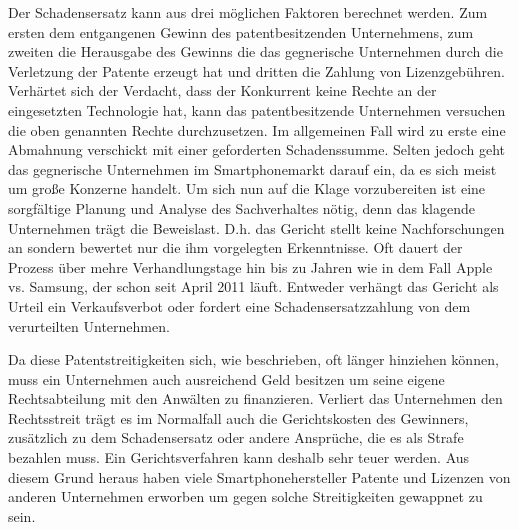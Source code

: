 Der Schadensersatz kann aus drei möglichen Faktoren berechnet werden. Zum ersten dem entgangenen Gewinn des patentbesitzenden Unternehmens, zum zweiten die Herausgabe des Gewinns die das gegnerische Unternehmen durch die Verletzung der Patente erzeugt hat und dritten die Zahlung von Lizenzgebühren. Verhärtet sich der Verdacht, dass der Konkurrent keine Rechte an der eingesetzten Technologie hat, kann das patentbesitzende Unternehmen versuchen die oben genannten Rechte durchzusetzen. Im allgemeinen Fall wird zu erste eine Abmahnung verschickt mit einer geforderten  Schadenssumme. Selten jedoch geht das gegnerische Unternehmen im Smartphonemarkt darauf ein, da es sich meist um große Konzerne handelt. Um sich nun auf die Klage vorzubereiten ist eine sorgfältige Planung und Analyse des Sachverhaltes nötig, denn das klagende Unternehmen trägt die Beweislast. D.h. das Gericht stellt keine Nachforschungen an sondern bewertet nur die ihm vorgelegten Erkenntnisse. Oft dauert der Prozess über mehre Verhandlungstage hin bis zu Jahren wie in dem Fall  Apple vs. Samsung,  der schon seit April 2011 läuft. Entweder verhängt das Gericht als Urteil ein Verkaufsverbot oder fordert eine Schadensersatzzahlung von dem verurteilten Unternehmen.

Da diese Patentstreitigkeiten sich, wie beschrieben, oft länger hinziehen können, muss ein Unternehmen auch ausreichend Geld besitzen um seine eigene Rechtsabteilung mit den Anwälten zu finanzieren. Verliert das Unternehmen den Rechtsstreit trägt es im Normalfall auch die Gerichtskosten des Gewinners, zusätzlich zu dem Schadensersatz oder andere Ansprüche, die es als Strafe bezahlen muss. Ein Gerichtsverfahren kann deshalb sehr teuer werden. Aus diesem Grund heraus haben viele Smartphonehersteller Patente und Lizenzen von anderen Unternehmen erworben um gegen solche Streitigkeiten gewappnet zu sein.

